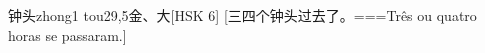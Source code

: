 \begin{EntryWithPhonetic}{钟头}{zhong1 tou2}{9,5}{⾦、⼤}[HSK 6]
  [三四个钟头过去了。===Três ou quatro horas se passaram.]
\end{EntryWithPhonetic}
